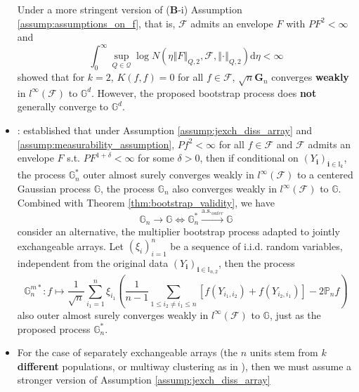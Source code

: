 \documentclass[twoside]{article}
\begin{document}
\begin{itemize}
    Under a more stringent version of (\textbf{B}-i) Assumption \ref{assump:assumptions_on_f}, that is, $\mathcal{F}$ admits an envelope $F$ with $PF^2< \infty$ and 
    $$
    \int^{\infty}_0 \sup_{Q\in\mathcal{Q}} \log N\left(\eta \left\Vert F \right\Vert _{Q,2},\mathcal{F}, \left\Vert \cdot \right\Vert _{Q,2}\right)\mathrm{d}\eta <\infty
    $$
    \citet{davezies2021empirical} showed that for $k=2$, $K(f,f)=0$ for all $f\in\mathcal{F}$, $\sqrt{n}\mathbf{G}_n$ converges \textbf{weakly} in $l^{\infty}(\mathcal{F})$ to $\mathbb{G}^d$. However, the proposed bootstrap process does \textbf{not} generally converge to $\mathbb{G}^d$.
    \item {}: \citet{davezies2021empirical} established that under Assumption \ref{assump:jexch_diss_array} and \ref{assump:measurability_assumption}, $Pf^2<\infty$ for all $f\in \mathcal{F}$ and $\mathcal{F}$ admits an envelope $F$ s.t. $PF^{1+\delta}<\infty$ for some $\delta>0$, then if conditional on $\left(Y_{\mathbf{i}}\right)_{\mathbf{i}\in\mathbb{I}_k}$, the process $\mathbb{G}_n^*$ outer almost surely converges weakly in $l^{\infty}\left(\mathcal{F}\right)$ to a centered Gaussian process $\mathbb{G}$, the process $\mathbb{G}_n$ also converges weakly in $l^{\infty}(\mathcal{F})$ to $\mathbb{G}$. 
    Combined with Theorem \ref{thm:bootstrap_validity}, we have $$ \mathbb{G}_n \rightarrow \mathbb{G} \Leftrightarrow \mathbb{G}^*_n \xrightarrow{\mathrm{a.s.}_{outer}} \mathbb{G} $$
    consider an alternative, the multiplier bootstrap process adapted to jointly exchangeable arrays. Let $\left(\xi_i\right)^n_{i=1}$ be a sequence of i.i.d. random variables, independent from the original data $\left(Y_{\mathbf{i}}\right)_{\mathbf{i}\in \mathbb{I}_{n,2}}$, then the process 
    \begin{equation*}
        \mathbb{G}^{m*}_{n}:f \mapsto \frac{1}{\sqrt{n}}\sum^n_{i_1=1} \xi_{i_1} \left(\frac{1}{n-1}\sum_{1\leq i_2\neq i_1\leq n} \left[f(Y_{i_1,i_2})+f(Y_{i_2,i_1})\right] - 2\mathbb{P}_n f\right)
    \end{equation*}
    also outer almost surely converges weakly in $l^{\infty}(\mathcal{F})$ to $\mathbb{G}$, just as the proposed process $\mathbb{G}_n^*$.
    \item {} For the case of separately exchangeable arrays (the $n$ units stem from $k$ \textbf{different} populations, or multiway clustering as in \citet{menzel2021bootstrap}), then we must assume a stronger version of Assumption \ref{assump:jexch_diss_array}

\end{itemize}
\end{document}
